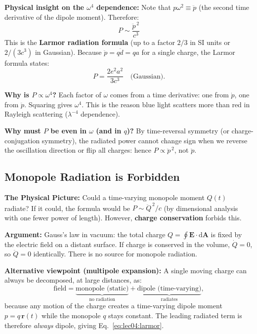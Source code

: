 \noindent\textbf{Physical insight on the $\omega^4$ dependence:} Note that
$p\omega^2 \equiv \ddot{p}$ (the second time derivative of the dipole moment).
Therefore:
\begin{equation}
    \boxed{P \sim \frac{\ddot{p}^{\,2}}{c^3}}
    \label{eq:lec04:larmor}
\end{equation}
This is the \textbf{Larmor radiation formula} (up to a factor $2/3$ in SI units
or $2/(3c^3)$ in Gaussian).  Because $\ddot{p} = q\ddot{d} = q a$ for a
single charge, the Larmor formula states:
\[
    P = \frac{2e^2 a^2}{3c^3} \quad \text{(Gaussian)}.
\]

\textbf{Why is $P \propto \omega^4$?}  Each factor of $\omega$ comes from a
time derivative: one from $\dot{p}$, one from $\ddot{p}$.  Squaring gives
$\omega^4$.  This is the reason blue light scatters more than red in Rayleigh
scattering ($\lambda^{-4}$ dependence).

\textbf{Why must $P$ be even in $\omega$ (and in $q$)?}
By time-reversal symmetry (or charge-conjugation symmetry), the radiated power
cannot change sign when we reverse the oscillation direction or flip all
charges: hence $P \propto \ddot{p}^{\,2}$, not $\ddot{p}$.

\subsection{Monopole Radiation is Forbidden}

\textbf{The Physical Picture:}
Could a time-varying monopole moment $Q(t)$ radiate?  If it could, the
formula would be $P \sim \ddot{Q}^{\,2}/c$ (by dimensional analysis with one
fewer power of length).  However, \textbf{charge conservation} forbids this.

\textbf{Argument:}
Gauss's law in vacuum: the total charge $Q = \oint \mathbf{E}\cdot\mathrm{d}\mathbf{A}$
is fixed by the electric field on a distant surface.  If charge is conserved
in the volume, $\dot{Q} = 0$, so $\ddot{Q} = 0$ identically.  There is no
source for monopole radiation.

\textbf{Alternative viewpoint (multipole expansion):} A single moving charge
can always be decomposed, at large distances, as:
\[
    \text{field} = \underbrace{\text{monopole (static)}}_{\text{no radiation}} +
    \underbrace{\text{dipole (time-varying)}}_{\text{radiates}},
\]
because any motion of the charge creates a time-varying dipole moment
$p = q\,\mathbf{r}(t)$ while the monopole $q$ stays constant.  The leading
radiated term is therefore \emph{always} dipole, giving Eq.~\eqref{eq:lec04:larmor}.

